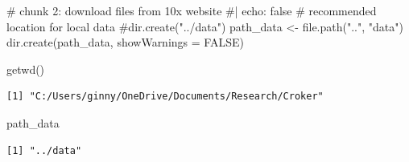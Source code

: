 \documentclass[
  letterpaper,
  DIV=11,
  numbers=noendperiod]{scrartcl}
\newenvironment{Shaded}{\begin{snugshade}}{\end{snugshade}}
\newcommand{\AttributeTok}[1]{\textcolor[rgb]{0.40,0.45,0.13}{#1}}
\newcommand{\CommentTok}[1]{\textcolor[rgb]{0.37,0.37,0.37}{#1}}
\newcommand{\ConstantTok}[1]{\textcolor[rgb]{0.56,0.35,0.01}{#1}}
\newcommand{\FunctionTok}[1]{\textcolor[rgb]{0.28,0.35,0.67}{#1}}
\newcommand{\NormalTok}[1]{\textcolor[rgb]{0.00,0.23,0.31}{#1}}
\newcommand{\OtherTok}[1]{\textcolor[rgb]{0.00,0.23,0.31}{#1}}
\newcommand{\StringTok}[1]{\textcolor[rgb]{0.13,0.47,0.30}{#1}}
\begin{document}
\begin{verbatim}
\end{verbatim}

\begin{Shaded}
\begin{Highlighting}[]
\CommentTok{\# chunk 2: download files from 10x website}
\CommentTok{\#| echo: false}
\CommentTok{\# recommended location for local data}
\CommentTok{\#dir.create("../data")}
\NormalTok{path\_data }\OtherTok{\textless{}{-}} \FunctionTok{file.path}\NormalTok{(}\StringTok{".."}\NormalTok{, }\StringTok{"data"}\NormalTok{)}
\FunctionTok{dir.create}\NormalTok{(path\_data, }\AttributeTok{showWarnings =} \ConstantTok{FALSE}\NormalTok{)}

\FunctionTok{getwd}\NormalTok{()}
\end{Highlighting}
\end{Shaded}

\begin{verbatim}
[1] "C:/Users/ginny/OneDrive/Documents/Research/Croker"
\end{verbatim}

\begin{Shaded}
\begin{Highlighting}[]
\NormalTok{path\_data}
\end{Highlighting}
\end{Shaded}

\begin{verbatim}
[1] "../data"
\end{verbatim}
\end{document}
